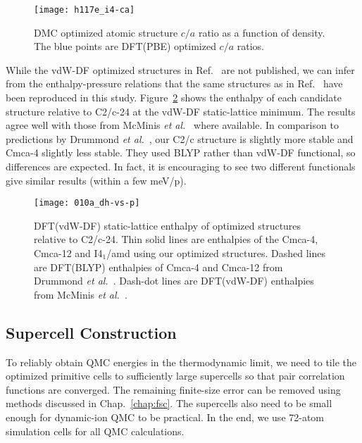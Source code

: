 \begin{figure}[h]
	\centering
	\begin{minipage}{0.49\textwidth}
		\centering
		\texttt{[image: h117e\_i4-ca]}
	\end{minipage}
	\caption{DMC optimized atomic structure $c/a$ ratio as a function of density. The blue points are DFT(PBE) optimized $c/a$ ratios.}
	\label{fig:hsolid-i4-ca}
\end{figure}

While the vdW-DF optimized structures in Ref.~\cite{McMinis2015} are not published, we can infer from the enthalpy-pressure relations that the same structures as in Ref.~\cite{McMinis2015} have been reproduced in this study. Figure~\ref{fig:dft-opt-geo} shows the enthalpy of each candidate structure relative to C2/c-24 at the vdW-DF static-lattice minimum. The results agree well with those from McMinis \textit{et al.}~\cite{McMinis2015} where available.
In comparison to predictions by Drummond \textit{et al.}~\cite{Drummond2015}, our C2/c structure is slightly more stable and Cmca-4 slightly less stable.
They used BLYP rather than vdW-DF functional, so differences are expected. In fact, it is encouraging to see two different functionals give similar results (within a few meV/p).

\begin{figure}[h]
	\centering
	\texttt{[image: 010a\_dh-vs-p]}
	\caption{DFT(vdW-DF) static-lattice enthalpy of optimized structures relative to C2/c-24. Thin solid lines are enthalpies of the Cmca-4, Cmca-12 and I4$_1$/amd using our optimized structures. Dashed lines are DFT(BLYP) enthalpies of Cmca-4 and Cmca-12 from Drummond \textit{et al.}~\cite{Drummond2015}. Dash-dot lines are DFT(vdW-DF) enthalpies from McMinis \textit{et al.}~\cite{McMinis2015}.}
	\label{fig:dft-opt-geo}
\end{figure}

\subsection{Supercell Construction}
To reliably obtain QMC energies in the thermodynamic limit, we need to tile the optimized primitive cells to sufficiently large supercells so that pair correlation functions are converged.
The remaining finite-size error can be removed using methods discussed in Chap.~\ref{chap:fsc}.
The supercells also need to be small enough for dynamic-ion QMC to be practical.
In the end, we use 72-atom simulation cells for all QMC calculations.

